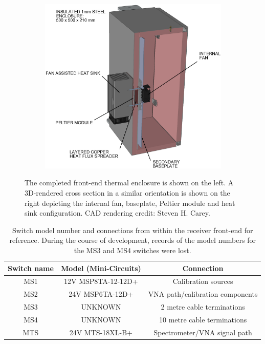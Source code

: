\begin{figure}[h!]
\begin{subfigure}{0.49\textwidth}
        \includegraphics[width=\textwidth]{enclosure_cross_section}
    \end{subfigure}
    \caption{The completed front-end thermal enclosure is shown on the left. A 3D-rendered cross section in a similar orientation is shown on the right depicting the internal fan, baseplate, Peltier module and heat sink configuration. CAD rendering credit: Steven H. Carey.}
    \label{fig:enclose_supp}
\end{figure}


\begin{table}
    \begin{center}
    \begin{tabular}{ |c|c|c| }
    \hline
    Switch name & Model (Mini-Circuits) & Connection \\
    \hline
    MS1 & 12V MSP8TA-12-12D+ & Calibration sources \\
    MS2 & 24V MSP6TA-12D+& VNA path/calibration components \\
    MS3 & UNKNOWN & 2 metre cable terminations \\
    MS4 & UNKNOWN & 10 metre cable terminations \\
    MTS & 24V MTS-18XL-B+ & Spectrometer/VNA signal path \\
    \hline
    \end{tabular}
    \caption{Switch model number and connections from within the receiver front-end for reference. During the course of development, records of the model numbers for the MS3 and MS4 switches were lost.}
    \label{tab:switches}
    \end{center}
\end{table}

